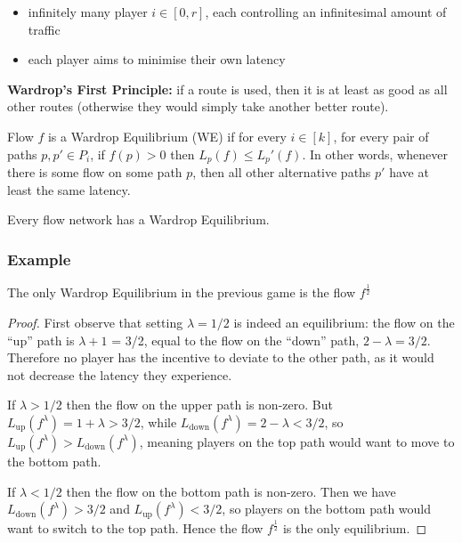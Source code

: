\begin{itemize}
	\item infinitely many player $i \in [0, r]$, each controlling an
		infinitesimal amount of traffic
	\item each player aims to minimise their own latency
\end{itemize}

\textbf{Wardrop's First Principle:} if a route is used, then it is at least as
good as all other routes (otherwise they would simply take another better
route).

\begin{definition}
	Flow $f$ is a Wardrop Equilibrium (WE) if for every $i \in [k]$, for
	every pair of paths $p, p' \in P_i$, if $f(p) > 0$ then $L_p(f) \le
	L_p'(f)$. In other words, whenever there is some flow on some path $p$,
	then all other alternative paths $p'$ have at least the same latency.
\end{definition}

\begin{fact}
	Every flow network has a Wardrop Equilibrium.
\end{fact}

\subsubsection{Example}

\begin{claim}
	The only Wardrop Equilibrium in the previous game is the flow
	$f^\frac{1}{2}$
\end{claim}
\begin{proof}
	First observe that setting $\lambda = 1/2$ is indeed an equilibrium: the
	flow on the ``up'' path is $\lambda + 1$ = 3/2, equal to the flow on the
	``down'' path, $2 - \lambda = 3/2$. Therefore no player has the incentive
	to deviate to the other path, as it would not decrease the latency they
	experience.

	If $\lambda > 1/2$ then the flow on the upper path is non-zero. But
	$L_\text{up}(f^\lambda) = 1 + \lambda > 3/2$, while
	$L_\text{down}(f^\lambda) = 2 - \lambda < 3/2$, so $L_\text{up}(f^\lambda)
	> L_\text{down}(f^\lambda)$, meaning players on the top path would want to
	move to the bottom path.

	If $\lambda < 1/2$ then the flow on the bottom path is non-zero. Then we
	have $L_\text{down}(f^\lambda) > 3/2$ and $L_\text{up}(f^\lambda) < 3/2$,
	so players on the bottom path would want to switch to the top path. Hence
	the flow $f^\frac{1}{2}$ is the only equilibrium.
\end{proof}

